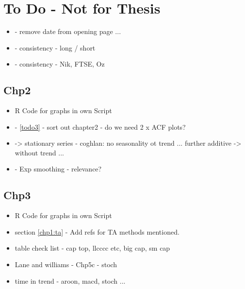 
\chapter{To Do - Not for Thesis} %

\label{Chapter7} %




\begin{itemize}
\item - remove date from opening page ...
\item - consistency - long / short
\item - consistency - Nik, FTSE, Oz

\end{itemize}

\section{Chp2}
\begin{itemize}
\item R Code for graphs in own Script
\item - \ref{todo3} - sort out chapter2 - do we need 2 x ACF plots?
\item -> stationary series - coghlan: no seasonality ot trend ...  further additive -> without trend ...
\item - Exp smoothing - relevance?
\end{itemize}

\section{Chp3}
\begin{itemize}
\item R Code for graphs in own Script
\item section \ref{chp1:ta} - Add refs for TA methods mentioned.
\item table check list - cap top, llcccc etc, big cap, sm cap
\item Lane \cite{lane1986using} and williams \cite{williams2011long} \cite{williams1989definitive} - Chp5c - stoch
\item time in trend - aroon, macd, stoch ...
\end{itemize}

